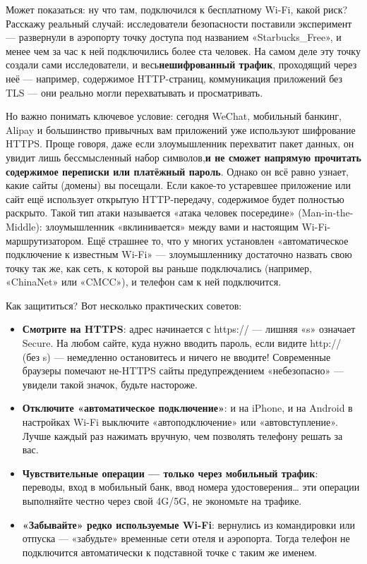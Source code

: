 
Может показаться: ну что там, подключился к бесплатному Wi-Fi, какой риск? Расскажу реальный случай: исследователи безопасности поставили эксперимент — развернули в аэропорту точку доступа под названием «Starbucks\_Free», и менее чем за час к ней подключились более ста человек. На самом деле эту точку создали сами исследователи, и весь\textbf{нешифрованный трафик}, проходящий через неё — например, содержимое HTTP-страниц, коммуникация приложений без TLS — они реально могли перехватывать и просматривать.

Но важно понимать ключевое условие: сегодня WeChat, мобильный банкинг, Alipay и большинство привычных вам приложений уже используют шифрование HTTPS. Проще говоря, даже если злоумышленник перехватит пакет данных, он увидит лишь бессмысленный набор символов,\textbf{и не сможет напрямую прочитать содержимое переписки или платёжный пароль}. Однако он всё равно узнает, какие сайты (домены) вы посещали. Если какое-то устаревшее приложение или сайт ещё использует открытую HTTP-передачу, содержимое будет полностью раскрыто. Такой тип атаки называется «атака человек посередине» (Man-in-the-Middle): злоумышленник «вклинивается» между вами и настоящим Wi-Fi-маршрутизатором. Ещё страшнее то, что у многих установлен «автоматическое подключение к известным Wi-Fi» — злоумышленнику достаточно назвать свою точку так же, как сеть, к которой вы раньше подключались (например, «ChinaNet» или «CMCC»), и телефон сам к ней подключится.

Как защититься? Вот несколько практических советов:

\begin{itemize}
  \item \textbf{Смотрите на HTTPS}: адрес начинается с https:// — лишняя «s» означает Secure. На любом сайте, куда нужно вводить пароль, если видите http:// (без s) — немедленно остановитесь и ничего не вводите! Современные браузеры помечают не-HTTPS сайты предупреждением «небезопасно» — увидели такой значок, будьте настороже.
  \item \textbf{Отключите «автоматическое подключение»}: и на iPhone, и на Android в настройках Wi-Fi выключите «автоподключение» или «автовступление». Лучше каждый раз нажимать вручную, чем позволять телефону решать за вас.
  \item \textbf{Чувствительные операции — только через мобильный трафик}: переводы, вход в мобильный банк, ввод номера удостоверения… эти операции выполняйте честно через свой 4G/5G, не экономьте на трафике.
  \item \textbf{«Забывайте» редко используемые Wi-Fi}: вернулись из командировки или отпуска — «забудьте» временные сети отеля и аэропорта. Тогда телефон не подключится автоматически к подставной точке с таким же именем.
\end{itemize}

